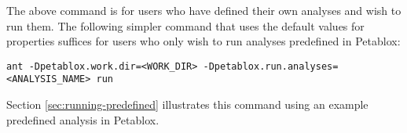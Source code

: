 The above command is for users who have defined their own analyses and wish
to run them.  The following simpler command that uses the default values for
properties  suffices for users who only wish to run
analyses predefined in Petablox:

\begin{framed}
\begin{verbatim}
ant -Dpetablox.work.dir=<WORK_DIR> -Dpetablox.run.analyses=<ANALYSIS_NAME> run
\end{verbatim}
\end{framed}

Section \ref{sec:running-predefined} illustrates this command using an example
predefined analysis in Petablox.

